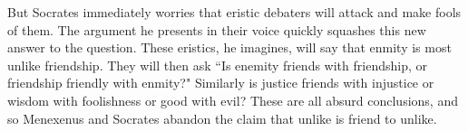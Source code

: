 \documentclass[11pt]{article}
\begin{document}
But Socrates immediately worries that eristic debaters will attack and make fools of them.  The argument he presents in their voice quickly squashes this new answer to the question.  These eristics, he imagines, will say that enmity is most unlike friendship.  They will then ask ``Is enemity friends with friendship, or friendship friendly with enmity?"  Similarly is justice friends with injustice or wisdom with foolishness or good with evil?  These are all absurd conclusions, and so Menexenus and Socrates abandon the claim that unlike is friend to unlike.

\newpage


\end{document}
